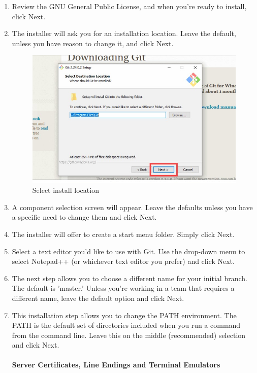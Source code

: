 \documentclass[12pt]{article}
\begin{document}
\begin{enumerate}
\item Review the GNU General Public License, and when you’re ready to install, click Next.

\item The installer will ask you for an installation location. Leave the default, unless you have reason to change it, and click Next.

\begin{figure}[H]
\centering
\includegraphics[scale=0.7]{gitinstall5}
\caption{Select install location}
\label{gitversion}
\vspace{0.6\baselineskip}
\end{figure}

\item A component selection screen will appear. Leave the defaults unless you have a specific need to change them and click Next.

\item The installer will offer to create a start menu folder. Simply click Next.

\item Select a text editor you’d like to use with Git. Use the drop-down menu to select Notepad++ (or whichever text editor you prefer) and click Next.

\item The next step allows you to choose a different name for your initial branch. The default is 'master.' Unless you're working in a team that requires a different name, leave the default option and click Next.

\item This installation step allows you to change the PATH environment. The PATH is the default set of directories included when you run a command from the command line. Leave this on the middle (recommended) selection and click Next.\\
\vspace{1\baselineskip}\\
{\bfseries Server Certificates, Line Endings and Terminal Emulators}


\end{enumerate}
\end{document}
